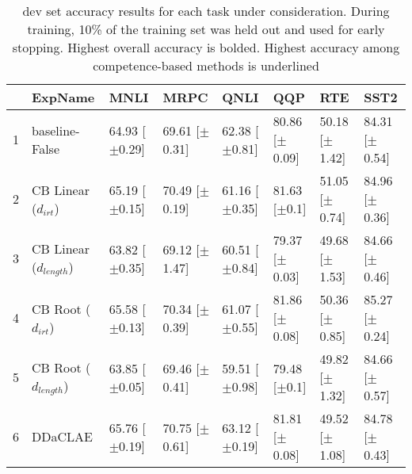 \begin{table}[ht]
\centering
\begin{tabular}{rlllllll}
  \toprule
 & ExpName & MNLI & MRPC & QNLI & QQP & RTE & SST2 \\ 
  \midrule
1 & baseline-False & 64.93 [$\pm$0.29] & 69.61 [$\pm$0.31] & 62.38 [$\pm$0.81] & 80.86 [$\pm$0.09] & 50.18 [$\pm$1.42] & 84.31 [$\pm$0.54] \\ 
  2 & CB Linear ($d_{irt}$) & 65.19 [$\pm$0.15] & 70.49 [$\pm$0.19] & 61.16 [$\pm$0.35] & 81.63 [$\pm$0.1] & 51.05 [$\pm$0.74] & 84.96 [$\pm$0.36] \\ 
  3 & CB Linear ($d_{length}$) & 63.82 [$\pm$0.35] & 69.12 [$\pm$1.47] & 60.51 [$\pm$0.84] & 79.37 [$\pm$0.03] & 49.68 [$\pm$1.53] & 84.66 [$\pm$0.46] \\ 
  4 & CB Root ($d_{irt}$) & 65.58 [$\pm$0.13] & 70.34 [$\pm$0.39] & 61.07 [$\pm$0.55] & 81.86 [$\pm$0.08] & 50.36 [$\pm$0.85] & 85.27 [$\pm$0.24] \\ 
  5 & CB Root ($d_{length}$) & 63.85 [$\pm$0.05] & 69.46 [$\pm$0.41] & 59.51 [$\pm$0.98] & 79.48 [$\pm$0.1] & 49.82 [$\pm$1.32] & 84.66 [$\pm$0.57] \\ 
  6 & DDaCLAE & 65.76 [$\pm$0.19] & 70.75 [$\pm$0.61] & 63.12 [$\pm$0.19] & 81.81 [$\pm$0.08] & 49.52 [$\pm$1.08] & 84.78 [$\pm$0.43] \\ 
   \bottomrule
\end{tabular}
\caption{dev set accuracy results for each task under consideration. During training, 10\% of the training set was held out and used for early stopping. Highest overall accuracy is bolded. Highest accuracy among competence-based methods is underlined} 
\end{table}
